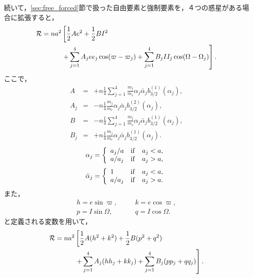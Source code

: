 \documentclass[11pt,a4paper,oneside,onecolumn]{jreport}
\begin{document}
続いて，\ref{sec:free_forced}節で扱った自由要素と強制要素を，４つの惑星がある場合に拡張すると，
\begin{equation}
\begin{split}
{\cal R} = n a^2 & \left[ \frac{1}{2} A e^2 + \frac{1}{2} B I^2 \right. \\
& \left. + \sum_{j = 1}^4  A_j e e_j \cos (\varpi - \varpi_j) + \sum_{j = 1}^4 B_j I I_j \cos (\Omega - \Omega_j) \right]. \\
\end{split} \label{}
\end{equation} 
ここで，
\begin{eqnarray}
A & = & + n \frac{1}{4} \sum_{j = 1}^4 \frac{m_j}{m_c} \alpha_j \bar{\alpha}_j b_{3/2}^{(1)} (\alpha_j), \label{eq:A_test_4planet} \\
A_j & = & - n \frac{1}{4} \frac{m_j}{m_c} \alpha_j \bar{\alpha}_j b_{3/2}^{(2)} (\alpha_j), \label{eq:A_j_test_4planet} \\
B & = & - n \frac{1}{4} \sum_{j = 1}^4 \frac{m_j}{m_c} \alpha_j \bar{\alpha}_j b_{3/2}^{(1)} (\alpha_j), \label{eq:B_test_4planet} \\
B_j & = & + n \frac{1}{4} \frac{m_j}{m_c} \alpha_j \bar{\alpha}_j b_{3/2}^{(1)} (\alpha_j). \label{eq:B_j_test_4planet}
\end{eqnarray}
\begin{equation}
\alpha_j = \left\{
\begin{array}{lll}
a_j / a & {\rm if} & a_j < a, \\
a / a_j & {\rm if} & a_j > a,
\end{array}
\right.
\end{equation}
\begin{equation}
\bar{\alpha}_j = \left\{
\begin{array}{lll}
1 & {\rm if} & a_j < a, \\
a / a_j & {\rm if} & a_j > a.
\end{array}
\right.
\end{equation}
また，
\begin{eqnarray}
h = e \sin \varpi, & \quad & k = e \cos \varpi, \\
p = I \sin \Omega, & \quad & q = I \cos \Omega.
\end{eqnarray}
と定義される変数を用いて，
\begin{equation}
\begin{split}
{\cal R} = n a^2 & \left[ \frac{1}{2} A (h^2 + k^2) + \frac{1}{2} B (p^2 + q^2) \right. \\
& \left. + \sum_{j = 1}^4 A_j (h h_j + k k_j) + \sum_{j = 1}^4 B_j (p p_j + q q_j) \right]. \\
\end{split} \label{}
\end{equation}
\end{document}

